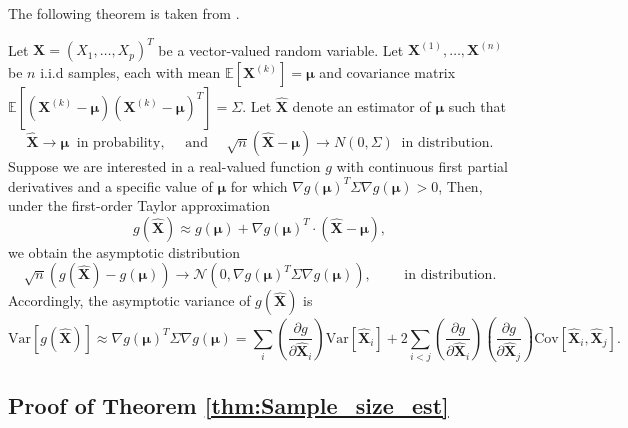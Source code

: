 The following theorem is taken from \cite{CaBe:1990,LeCa:1998}.
\begin{theorem}\label{thm:Delta_method}
Let $\boldsymbol{X} = (X_1,\ldots,X_p)^T$ be a vector-valued random variable. Let $\boldsymbol{X}^{(1)}, \ldots, \boldsymbol{X}^{(n)}$ be $n$ i.i.d samples, each with mean $\mathbb{E}[\boldsymbol{X}^{(k)}] = \boldsymbol{\mu}$ and covariance matrix $\mathbb{E}[(\boldsymbol{X}^{(k)}-\boldsymbol{\mu})(\boldsymbol{X}^{(k)}-\boldsymbol{\mu})^T] = \Sigma$. Let $\widehat {\boldsymbol{X}}$ denote an estimator of $\boldsymbol{\mu}$ such that 
%
\[
\widehat {\boldsymbol{X}}\rightarrow \boldsymbol{\mu} \;\; \text{in probability},\quad \text{ and } \quad\sqrt{n}\left(\widehat {\boldsymbol{X}}-\boldsymbol{\mu}\right)\rightarrow N(0,\Sigma) \;\; \text{in distribution}.
\]
%
Suppose we are interested in a real-valued function $g$ with continuous first partial derivatives and a specific value of $\boldsymbol{\mu}$ for which $\nabla g(\boldsymbol{\mu})^T\Sigma\nabla g(\boldsymbol{\mu})>0$,  Then, under the first-order Taylor approximation 
\[
g\left(\widehat {\boldsymbol{X}}\right) \approx g\left(\boldsymbol{\mu}\right) + \nabla g(\boldsymbol{\mu})^T\cdot \left(\widehat {\boldsymbol{X}}-\boldsymbol{\mu}\right),
\]
we obtain the asymptotic distribution
\[
\sqrt{n}\left(g\left(\widehat {\boldsymbol{X}}\right) - g(\boldsymbol{\mu})\right)\rightarrow \mathcal{N}\left(0,\nabla g(\boldsymbol{\mu})^T\Sigma\nabla g(\boldsymbol{\mu})\right),\qquad \text{ in distribution.}
\]
Accordingly, the asymptotic variance of $g(\widehat {\boldsymbol{X}})$ is 
\[
\text{Var}\left[g(\widehat {\boldsymbol{X}})\right] \approx\nabla g(\boldsymbol{\mu})^T\Sigma\nabla g(\boldsymbol{\mu}) = \sum_i \left(\frac{\partial g}{\partial \widehat {\boldsymbol{X}}_i}\right)\text{Var}\left[\widehat {\boldsymbol{X}}_i\right] +  2\sum_{i<j} \left(\frac{\partial g}{\partial \widehat {\boldsymbol{X}}_i}\right)\left(\frac{\partial g}{\partial \widehat {\boldsymbol{X}}_j}\right)\text{Cov}\left[\widehat {\boldsymbol{X}}_i,\widehat {\boldsymbol{X}}_j\right].
\]

\end{theorem}



\subsection{Proof of Theorem \ref{thm:Sample_size_est}}

